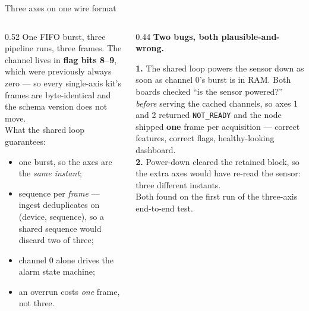 \documentclass[aspectratio=169,10pt]{beamer}
\begin{document}
\begin{frame}{Three axes on one wire format}
  \begin{columns}[T]
    \begin{column}{0.52\textwidth}
      \scriptsize
      One FIFO burst, three pipeline runs, three frames. The channel lives in
      \textbf{flag bits 8--9}, which were previously always zero --- so every
      single-axis kit's frames are byte-identical and the schema version does
      not move.
      \\[2mm]
      What the shared loop guarantees:
      \begin{itemize}\itemsep1pt
        \item one burst, so the axes are the \emph{same instant};
        \item sequence per \emph{frame} --- ingest deduplicates on
              (device, sequence), so a shared sequence would discard two of
              three;
        \item channel 0 alone drives the alarm state machine;
        \item an overrun costs \emph{one} frame, not three.
      \end{itemize}
    \end{column}
    \begin{column}{0.44\textwidth}
      \scriptsize\color{pdmcrit}
      \textbf{Two bugs, both plausible-and-wrong.}
      \par\color{pdmink2}
      \textbf{1.} The shared loop powers the sensor down as soon as channel 0's
      burst is in RAM. Both boards checked ``is the sensor powered?'' \emph{before}
      serving the cached channels, so axes 1 and 2 returned \texttt{NOT\_READY}
      and the node shipped \textbf{one} frame per acquisition --- correct
      features, correct flags, healthy-looking dashboard.
      \\[1mm]
      \textbf{2.} Power-down cleared the retained block, so the extra axes would
      have re-read the sensor: three different instants.
      \\[1mm]
      Both found on the first run of the three-axis end-to-end test.
    \end{column}
  \end{columns}
\end{frame}
\end{document}
